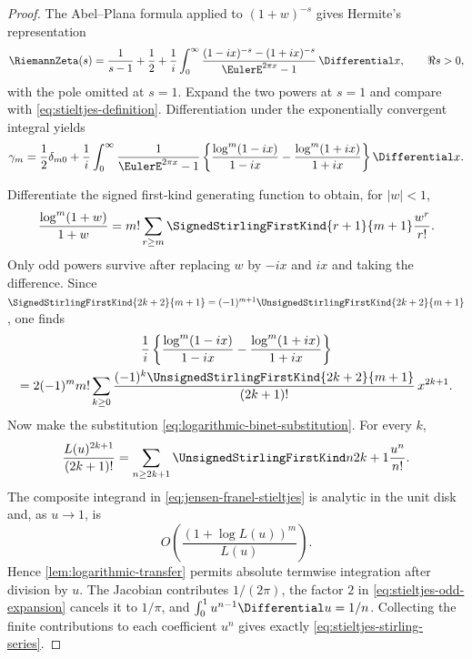 \documentclass[11pt,a4paper,oneside,openany]{book}
\theoremstyle{definition}
\theoremstyle{remark}
\begin{document}
\begin{proof}
The Abel--Plana formula applied to $(1+w)^{-s}$ gives Hermite's representation
\begin{equation}
\label{eq:hermite-zeta}
 \RiemannZeta(s)=\frac1{s-1}+\frac12+\frac1i\int_0^\infty
 \frac{(1-ix)^{-s}-(1+ix)^{-s}}{\EulerE^{2\pi x}-1}\,\Differential x,
 \qquad \Re s>0,
\end{equation}
with the pole omitted at $s=1$.  Expand the two powers at $s=1$ and compare with
\eqref{eq:stieltjes-definition}.  Differentiation under the exponentially
convergent integral yields
\begin{equation}
\label{eq:jensen-franel-stieltjes}
 \gamma_m=\frac12\delta_{m0}+\frac1i\int_0^\infty\frac1{\EulerE^{2\pi x}-1}
 \left\{
 \frac{\log^m(1-ix)}{1-ix}
 -\frac{\log^m(1+ix)}{1+ix}
 \right\}\Differential x.
\end{equation}

Differentiate the signed first-kind generating function to obtain, for $|w|<1$,
\begin{equation}
\label{eq:log-power-over-linear}
 \frac{\log^m(1+w)}{1+w}
 =m!\sum_{r\ge m}\SignedStirlingFirstKind{r+1}{m+1}\frac{w^r}{r!}.
\end{equation}
Only odd powers survive after replacing $w$ by $-ix$ and $ix$ and taking the
difference.  Since
$\SignedStirlingFirstKind{2k+2}{m+1}=(-1)^{m+1}\UnsignedStirlingFirstKind{2k+2}{m+1}$, one finds
\begin{multline}
\label{eq:stieltjes-odd-expansion}
 \frac1i\left\{
 \frac{\log^m(1-ix)}{1-ix}
 -\frac{\log^m(1+ix)}{1+ix}
 \right\}\\
 =2(-1)^m m!\sum_{k\ge0}
 \frac{(-1)^k\UnsignedStirlingFirstKind{2k+2}{m+1}}{(2k+1)!}\,x^{2k+1}.
\end{multline}
Now make the substitution \eqref{eq:logarithmic-binet-substitution}.  For every
$k$,
\[
 \frac{L(u)^{2k+1}}{(2k+1)!}
 =\sum_{n\ge2k+1}\UnsignedStirlingFirstKind n{2k+1}\frac{u^n}{n!}.
\]
The composite integrand in \eqref{eq:jensen-franel-stieltjes} is analytic in the
unit disk and, as $u\to1$, is
\[
 O\!\left(\frac{(1+\log L(u))^m}{L(u)}\right).
\]
Hence \cref{lem:logarithmic-transfer} permits absolute termwise integration after
division by $u$.  The Jacobian contributes $1/(2\pi)$, the factor $2$ in
\eqref{eq:stieltjes-odd-expansion} cancels it to $1/\pi$, and
$\int_0^1u^{n-1}\Differential u=1/n$.  Collecting the finite contributions to each
coefficient $u^n$ gives exactly \eqref{eq:stieltjes-stirling-series}.
\end{proof}
\end{document}
